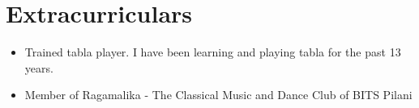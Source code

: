 \documentclass{resume}
\begin{document}
\section{Extracurriculars}
\begin{itemize}\setlength{\itemsep}{0pt}\setlength{\parskip}{0pt}\vspace{-0.5em}
    \item Trained tabla player. I have been learning and playing tabla for the past 13 years.
    \item Member of Ragamalika - The Classical Music and Dance Club of BITS Pilani 
\end{itemize}
\end{document}

